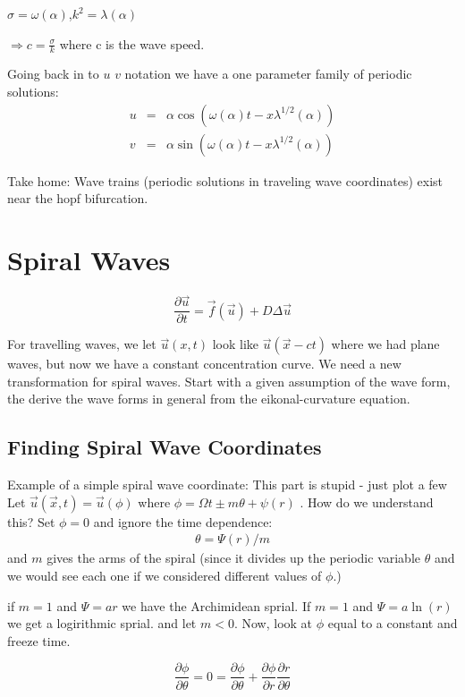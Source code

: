 \documentclass[]{article}
\numberwithin{equation}{section}		%
\def\bea{\begin{eqnarray}}
\def\ena{\end{eqnarray}}
\begin{document}
\begin{center}
$\sigma=\omega(\alpha)$,\hspace{0.25in}$k^2=\lambda(\alpha)$
\end{center}

\begin{center}
$\Rightarrow c=\frac{\sigma}{k}$ where c is the wave speed.
\end{center}

Going back in to $u$ $v$ notation we have a one parameter family of periodic solutions: 
\bea
u &=& \alpha\cos(\omega(\alpha)t-x\lambda^{1/2}(\alpha)) \nonumber \\
v&=& \alpha\sin(\omega(\alpha)t-x\lambda^{1/2}(\alpha)) \nonumber 
\ena

Take home: Wave trains (periodic solutions in traveling wave coordinates) exist near the hopf bifurcation.


\newpage
\section{Spiral Waves}

$$\frac{\partial\vec{u}}{\partial t}=\vec{f}(\vec{u})+D\Delta\vec{u}$$

For travelling waves, we let $\vec{u}(x,t)$ look like $\vec{u}(\vec{x}-ct)$ where we had plane waves, but now we have a constant concentration curve. We need a new transformation for spiral waves. Start with a given assumption of the wave form, the derive the wave forms in general from the eikonal-curvature equation.

\subsection{Finding Spiral Wave Coordinates}
Example of a simple spiral wave coordinate:
This part is stupid - just plot a few
Let $\vec{u}(\vec{x},t)=\vec{u}(\phi)$ where $\phi=\Omega t \pm m\theta+\psi(r)$ .
How do we understand this? Set $\phi=0$ and ignore the time dependence:
\bea
\theta = \Psi(r)/m
\ena and $m$ gives the arms of the spiral  (since it divides up the periodic variable $\theta$ and we would see each one if we considered different values of $\phi$.)

 if $m=1$ and $\Psi=ar$ we have the Archimidean sprial. If $m=1$ and $\Psi = a\ln(r)$ we get a logirithmic sprial.
and let $m<0$. Now, look at $\phi$ equal to a constant and freeze time.

$$\frac{\partial\phi}{\partial\theta}=0=\frac{\partial\phi}{\partial\theta}+\frac{\partial\phi}{\partial r}\frac{\partial r}{\partial\theta}$$
\end{document}
